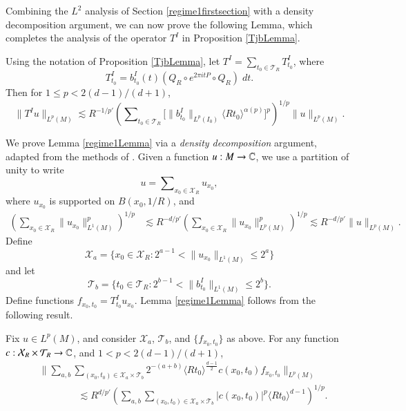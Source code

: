 Combining the $L^2$ analysis of Section \ref{regime1firstsection} with a density decomposition argument, we can now prove the following Lemma, which completes the analysis of the operator $T^I$ in Proposition \ref{TjbLemma}.

\begin{lemma} \label{regime1Lemma}
    Using the notation of Proposition \ref{TjbLemma}, let $T^I = \sum\nolimits_{t_0 \in \mathcal{T}_R} T^I_{t_0}$, where
    \[ T^I_{t_0} = b_{t_0}^I(t) (Q_R \circ e^{2 \pi i t P} \circ Q_R)\; dt. \]
    Then for $1 \leq p < 2 (d-1) / (d+1)$,
    \[ \| T^I u \|_{L^p(M)} \lesssim R^{-1/p'} \left( \sum\nolimits_{t_0 \in \mathcal{T}_R} \Big[ \| b^I_{t_0} \|_{L^p(I_0)} \langle R t_0 \rangle^{\alpha(p)} \Big]^p \right)^{1/p} \| u \|_{L^p(M)}. \]
\end{lemma}

We prove Lemma \ref{regime1Lemma} via a \emph{density decomposition} argument, adapted from the methods of \cite{HeoandNazarovandSeeger}. Given a function $u: M \to \operatorname{\mathbb{C}}$, we use a partition of unity to write
%
\begin{equation}
    u = \sum\nolimits_{x_0 \in \mathcal{X}_R} u_{x_0},
\end{equation}
%
where $u_{x_0}$ is supported on $B(x_0,1/R)$, and
%
\begin{equation}
\begin{split}
    \left( \sum\nolimits_{x_0 \in \mathcal{X}_R} \| u_{x_0} \|_{L^1(M)}^p \right)^{1/p} &\lesssim R^{-d/p'} \left( \sum\nolimits_{x_0 \in \mathcal{X}_R} \| u_{x_0} \|_{L^p(M)}^p \right)^{1/p} \lesssim R^{-d/p'} \| u \|_{L^p(M)}.
\end{split}
\end{equation}
Define
%
\begin{equation}
    \mathcal{X}_{a} = \{ x_0 \in \mathcal{X}_R: 2^{a-1} < \| u_{x_0} \|_{L^1(M)} \leq 2^a \}
\end{equation}
%
and let
%
\begin{equation}
    \mathcal{T}_{b} = \{ t_0 \in \mathcal{T}_R: 2^{b-1} < \| b_{t_0}^I \|_{L^1(M)} \leq 2^b \}.
\end{equation}
%
Define functions $f_{x_0,t_0} = T_{t_0}^I u_{x_0}$. Lemma \ref{regime1Lemma} follows from the following result.

\begin{lemma} \label{LpBoundLemma}
    Fix $u \in L^p(M)$, and consider $\mathcal{X}_{a}$, $\mathcal{T}_{b}$, and $\{ f_{x_0,t_0} \}$ as above. For any function $c: \mathcal{X}_R \times \mathcal{T}_R \to \operatorname{\mathbb{C}}$, and $1 < p < 2 (d-1) / (d+1)$,
    \begin{align*}
    &\Bigg\| \sum\nolimits_{a,b} \sum\nolimits_{(x_0,t_0) \in \mathcal{X}_{a} \times \mathcal{T}_{b}} 2^{-(a+b)} \langle R t_0 \rangle^{\frac{d-1}{2}} c(x_0,t_0) f_{x_0,t_0} \Big\|_{L^p(M)}\\
    &\quad\quad\quad\quad \lesssim R^{ d / p'} \left( \sum\nolimits_{a,b} \sum\nolimits_{(x_0,t_0) \in \mathcal{X}_{a} \times \mathcal{T}_{b}} |c(x_0,t_0)|^p \langle R t_0 \rangle^{d-1} \right)^{1/p}.
    \end{align*}
\end{lemma}

